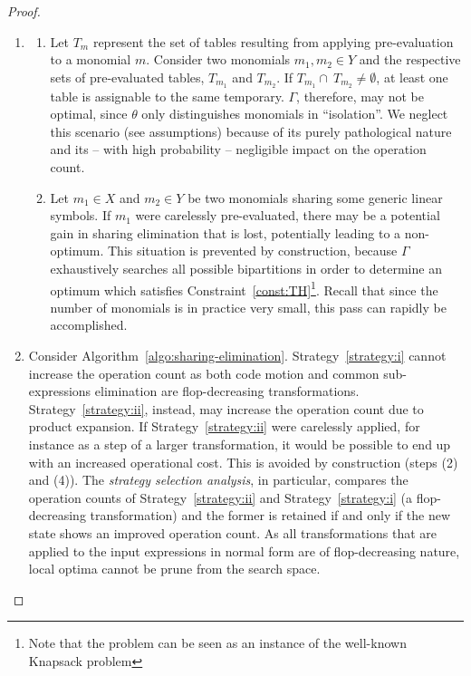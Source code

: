 \begin{proof}
\begin{enumerate}
\item 
\begin{enumerate}
\item Let $T_m$ represent the set of tables resulting from applying pre-evaluation to a monomial $m$. Consider two monomials $m_1, m_2 \in Y$ and the respective sets of pre-evaluated tables, $T_{m_{1}}$ and $T_{m_{2}}$. If $T_{m_{1}} \cap\ T_{m_{2}} \neq \emptyset$, at least one table is assignable to the same temporary. $\Gamma$, therefore, may not be optimal, since $\theta$ only distinguishes monomials in ``isolation''. We neglect this scenario (see assumptions) because of its purely pathological nature and its -- with high probability -- negligible impact on the operation count.
\item Let $m_1 \in X$ and $m_2 \in Y$ be two monomials sharing some generic linear symbols. If $m_1$ were carelessly pre-evaluated, there may be a potential gain in sharing elimination that is lost, potentially leading to a non-optimum. This situation is prevented by construction, because $\Gamma$ exhaustively searches all possible bipartitions in order to determine an optimum which satisfies Constraint~\ref{const:TH}\footnote{Note that the problem can be seen as an instance of the well-known Knapsack problem}. Recall that since the number of monomials is in practice very small, this pass can rapidly be accomplished.
\end{enumerate}
\item Consider Algorithm~\ref{algo:sharing-elimination}. Strategy~\ref{strategy:i} cannot increase the operation count as both code motion and common sub-expressions elimination are flop-decreasing transformations. Strategy~\ref{strategy:ii}, instead, may increase the operation count due to product expansion. If Strategy~\ref{strategy:ii} were carelessly applied, for instance as a step of a larger transformation, it would be possible to end up with an increased operational cost. This is avoided by construction (steps (2) and (4)). The {\em strategy selection analysis}, in particular, compares the operation counts of Strategy~\ref{strategy:ii} and Strategy~\ref{strategy:i} (a flop-decreasing transformation) and the former is retained if and only if the new state shows an improved operation count. As all transformations that are applied to the input expressions in normal form are of flop-decreasing nature, local optima cannot be prune from the search space.


\end{enumerate}
\end{proof}
